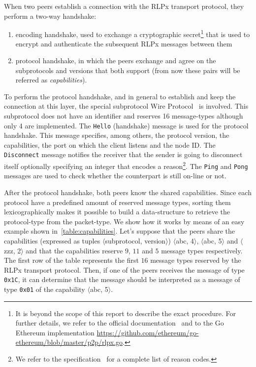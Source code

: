When two peers establish a connection with the RLPx transport protocol, they
perform a two-way handshake:
\begin{enumerate}
  \item encoding handshake, used to exchange a cryptographic secret\footnote{It
  is beyond the scope of this report to describe the exact procedure. For
  further details, we refer to the official documentation~\cite{rlpx} and to the
  Go Ethereum implementation
  \url{https://github.com/ethereum/go-ethereum/blob/master/p2p/rlpx.go}.}
  that is used to encrypt and authenticate the subsequent RLPx messages between
  them
  \item protocol handshake, in which the peers exchange and agree on the
  subprotocols and versions that both support (from now these pairs will be
  referred as \emph{capabilities}).
\end{enumerate}

To perform the protocol handshake, and in general to establish and keep the
connection at this layer, the special subprotocol \devpp{} Wire
Protocol~\cite{devp2pwire} is involved. This subprotocol does not have an
identifier and reserves 16 message-types although only 4 are implemented. The
\verb+Hello+ (handshake) message is used for the protocol handshake. This
message specifies, among others, the protocol version, the capabilities, the
port on which the client listens and the node ID. The \verb+Disconnect+ message
notifies the receiver that the sender is going to disconnect itself optionally
specifying an integer that encodes a reason\footnote{We refer to the \devpp{}
specification~\cite{devp2pwire} for a complete list of reason codes.}. The
\verb+Ping+ and \verb+Pong+ messages are used to check whether the counterpart
is still on-line or not.

After the protocol handshake, both peers know the shared capabilities. Since
each protocol have a predefined amount of reserved message types, sorting them
lexicographically makes it possible to build a data-structure to retrieve the
protocol-type from the packet-type. We show how it works by means of an easy
example shown in~\autoref{table:capabilities}. Let's suppose that the peers
share the capabilities (expressed as tuples $\langle$subprotocol,
version$\rangle$) $\langle$abc, 4$\rangle$, $\langle$abc, 5$\rangle$ and
$\langle$zzz, 2$\rangle$ and that the capabilities reserve $9$, $11$ and $5$
message types respectively. The first row of the table represents the first $16$
message types reserved by the RLPx transport protocol. Then, if one of the peers
receives the message of type \texttt{0x1C}, it can determine that the message
should be interpreted as a message of type \texttt{0x01} of the capability
$\langle$abc, 5$\rangle$.

